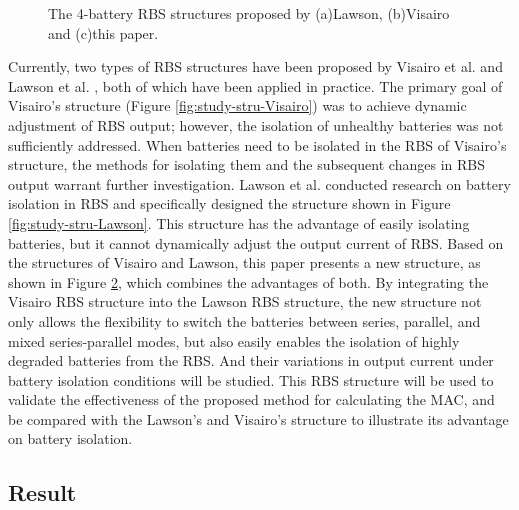 \documentclass{article}
\begin{document}
\begin{figure}[htbp]
\begin{subfigure}[b]{0.31\textwidth}
        \caption{}
        \label{fig:study-stru-my}
    \end{subfigure}
    \caption{The 4-battery RBS structures proposed by (a)Lawson\cite{lawsonSoftwareConfigurableBattery2012}, (b)Visairo\cite{visairoReconfigurableBatteryPack2008} and (c)this paper.}
\end{figure}

Currently, two types of RBS structures have been proposed by Visairo et al. \cite{visairoReconfigurableBatteryPack2008} and Lawson et al. \cite{lawsonSoftwareConfigurableBattery2012}, both of which have been applied in practice. 
The primary goal of Visairo's structure (Figure \ref{fig:study-stru-Visairo}) was to achieve dynamic adjustment of RBS output; however, the isolation of unhealthy batteries was not sufficiently addressed. 
When batteries need to be isolated in the RBS of Visairo's structure, the methods for isolating them and the subsequent changes in RBS output warrant further investigation.
Lawson et al. conducted research on battery isolation in RBS and specifically designed the structure shown in Figure \ref{fig:study-stru-Lawson}. 
This structure has the advantage of easily isolating batteries, but it cannot dynamically adjust the output current of RBS. 
Based on the structures of Visairo and Lawson, this paper presents a new structure, as shown in Figure \ref{fig:study-stru-my}, which combines the advantages of both.
By integrating the Visairo RBS structure into the Lawson RBS structure, the new structure not only allows the flexibility to switch the batteries between series, parallel, and mixed series-parallel modes, but also easily enables the isolation of highly degraded batteries from the RBS.
And their variations in output current under battery isolation conditions will be studied.
This RBS structure will be used to validate the effectiveness of the proposed method for calculating the MAC, and be compared with the Lawson's and Visairo's structure to illustrate its advantage on battery isolation.

\subsection{Result}
\end{document}
